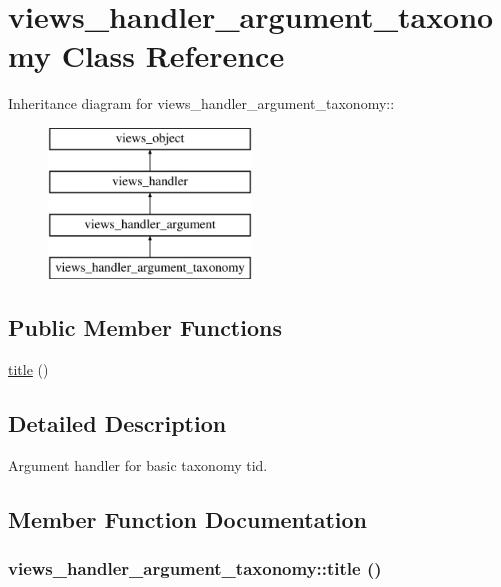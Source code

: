 \hypertarget{classviews__handler__argument__taxonomy}{
\section{views\_\-handler\_\-argument\_\-taxonomy Class Reference}
\label{classviews__handler__argument__taxonomy}
}
Inheritance diagram for views\_\-handler\_\-argument\_\-taxonomy::\begin{figure}[H]
\begin{center}
\leavevmode
\includegraphics[height=4cm]{classviews__handler__argument__taxonomy}
\end{center}
\end{figure}
\subsection*{Public Member Functions}
\begin{CompactItemize}
\item 
\hyperlink{classviews__handler__argument__taxonomy_330517e71ccc84fe85e871e05640c36d}{title} ()
\end{CompactItemize}


\subsection{Detailed Description}
Argument handler for basic taxonomy tid. 

\subsection{Member Function Documentation}
\hypertarget{classviews__handler__argument__taxonomy_330517e71ccc84fe85e871e05640c36d}{
\subsubsection[{title}]{\setlength{\rightskip}{0pt plus 5cm}views\_\-handler\_\-argument\_\-taxonomy::title ()}}
\label{classviews__handler__argument__taxonomy_330517e71ccc84fe85e871e05640c36d}


